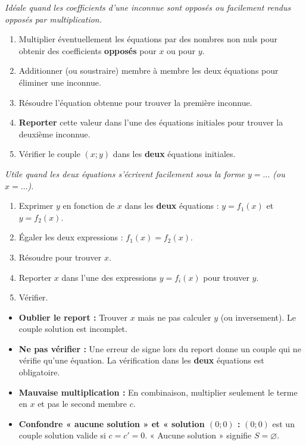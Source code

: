 \documentclass[11pt]{article}
\begin{document}
\begin{methode}
\emph{Idéale quand les coefficients d'une inconnue sont opposés ou facilement rendus opposés par multiplication.}
\begin{enumerate}
    \item Multiplier éventuellement les équations par des nombres non nuls pour obtenir des coefficients \textbf{opposés} pour $x$ ou pour $y$.
    \item Additionner (ou soustraire) membre à membre les deux équations pour éliminer une inconnue.
    \item Résoudre l'équation obtenue pour trouver la première inconnue.
    \item \textbf{Reporter} cette valeur dans l'une des équations initiales pour trouver la deuxième inconnue.
    \item Vérifier le couple $(x ; y)$ dans les \textbf{deux} équations initiales.
\end{enumerate}
\end{methode}

\begin{methode}
\emph{Utile quand les deux équations s'écrivent facilement sous la forme $y = \dots$ (ou $x = \dots$).}
\begin{enumerate}
    \item Exprimer $y$ en fonction de $x$ dans les \textbf{deux} équations : $y = f_1(x)$ et $y = f_2(x)$.
    \item Égaler les deux expressions : $f_1(x) = f_2(x)$.
    \item Résoudre pour trouver $x$.
    \item Reporter $x$ dans l'une des expressions $y = f_i(x)$ pour trouver $y$.
    \item Vérifier.
\end{enumerate}
\end{methode}

\begin{attention}
\begin{itemize}
    \item \textbf{Oublier le report :} Trouver $x$ mais ne pas calculer $y$ (ou inversement). Le couple solution est incomplet.
    \item \textbf{Ne pas vérifier :} Une erreur de signe lors du report donne un couple qui ne vérifie qu'une équation. La vérification dans les \textbf{deux} équations est obligatoire.
    \item \textbf{Mauvaise multiplication :} En combinaison, multiplier seulement le terme en $x$ et pas le second membre $c$.
    \item \textbf{Confondre « aucune solution » et « solution $(0;0)$ :} $(0;0)$ est un couple solution valide si $c=c'=0$. « Aucune solution » signifie $S=\varnothing$.
\end{itemize}
\end{attention}
\end{document}
